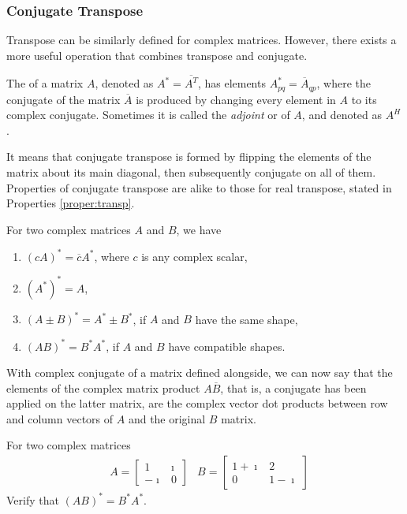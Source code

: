 \subsubsection{Conjugate Transpose}
Transpose can be similarly defined for complex matrices. However, there exists a more useful operation that combines transpose and conjugate.
\begin{defn}
The  of a matrix $A$, denoted as $A^* = \overline{A^T}$, has elements $A^*_{pq} = \overline{A}_{qp}$, where the conjugate of the matrix $\overline{A}$ is produced by changing every element in $A$ to its complex conjugate. Sometimes it is called the \textit{adjoint} or  of $A$, and denoted as $A^H$. 
\end{defn}
It means that conjugate transpose is formed by flipping the elements of the matrix about its main diagonal, then subsequently conjugate on all of them. Properties of conjugate transpose are alike to those for real transpose, stated in Properties \ref{proper:transp}.
\begin{proper}
For two complex matrices $A$ and $B$, we have
\begin{enumerate}
\item $(cA)^* = \overline{c}A^*$, where $c$ is any complex scalar,
\item $(A^*)^* = A$,
\item $(A \pm B)^* = A^* \pm B^*$, if $A$ and $B$ have the same shape,
\item $(AB)^* = B^*A^*$, if $A$ and $B$ have compatible shapes.
\end{enumerate}
\end{proper}
With complex conjugate of a matrix defined alongside, we can now say that the elements of the complex matrix product $A\overline{B}$, that is, a conjugate has been applied on the latter matrix, are the complex vector dot products between row and column vectors of $A$ and the original $B$ matrix.
\begin{exmp}
For two complex matrices
\begin{align*}
& A =
\begin{bmatrix}
1 & \imath \\
-\imath & 0
\end{bmatrix} 
& B =
\begin{bmatrix}
1+\imath & 2 \\
0 & 1-\imath
\end{bmatrix}
\end{align*}
Verify that $(AB)^* = B^*A^*$.
\end{exmp}
